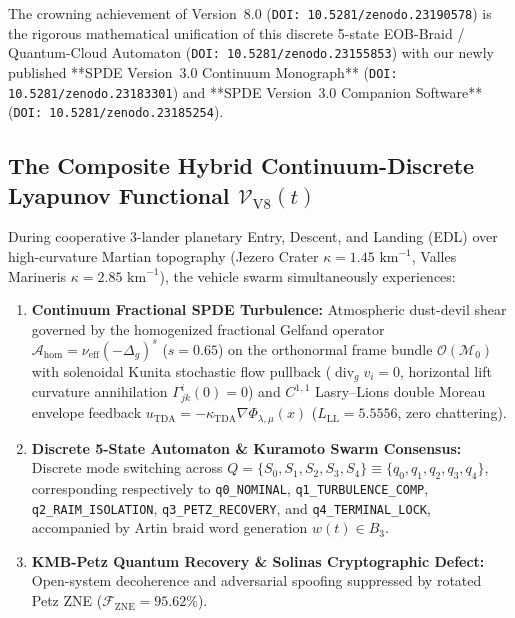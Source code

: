 \documentclass[11pt,a4paper,reqno]{article}
\theoremstyle{plain}
\theoremstyle{definition}
\theoremstyle{remark}
\numberwithin{equation}{section}
\begin{document}
The crowning achievement of Version~8.0 (\texttt{DOI: 10.5281/zenodo.23190578}) is the rigorous mathematical unification of this discrete 5-state EOB-Braid / Quantum-Cloud Automaton (\texttt{DOI: 10.5281/zenodo.23155853}) with our newly published **SPDE Version~3.0 Continuum Monograph** (\texttt{DOI: 10.5281/zenodo.23183301}) and **SPDE Version~3.0 Companion Software** (\texttt{DOI: 10.5281/zenodo.23185254}).

\subsection{The Composite Hybrid Continuum-Discrete Lyapunov Functional \texorpdfstring{$\mathcal{V}_{\mathrm{V8}}(t)$}{V\_V8(t)}}
During cooperative 3-lander planetary Entry, Descent, and Landing (EDL) over high-curvature Martian topography (Jezero Crater $\kappa = 1.45\text{ km}^{-1}$, Valles Marineris $\kappa = 2.85\text{ km}^{-1}$), the vehicle swarm simultaneously experiences:
\begin{enumerate}
    \item \textbf{Continuum Fractional SPDE Turbulence:} Atmospheric dust-devil shear governed by the homogenized fractional Gelfand operator $\mathcal{A}_{\mathrm{hom}} = \nu_{\mathrm{eff}}(-\Delta_g)^s$ ($s = 0.65$) on the orthonormal frame bundle $\mathcal{O}(\mathcal{M}_0)$ with solenoidal Kunita stochastic flow pullback ($\operatorname{div}_g v_i = 0$, horizontal lift curvature annihilation $\Gamma_{jk}^i(0) = 0$) and $C^{1,1}$ Lasry--Lions double Moreau envelope feedback $u_{\mathrm{TDA}} = -\kappa_{\mathrm{TDA}} \nabla \Phi_{\lambda,\mu}(x)$ ($L_{\mathrm{LL}} = 5.5556$, zero chattering).
    \item \textbf{Discrete 5-State Automaton \& Kuramoto Swarm Consensus:} Discrete mode switching across $Q = \{S_0, S_1, S_2, S_3, S_4\} \equiv \{q_0, q_1, q_2, q_3, q_4\}$, corresponding respectively to \texttt{q0\_NOMINAL}, \texttt{q1\_TURBULENCE\_COMP}, \texttt{q2\_RAIM\_ISOLATION}, \texttt{q3\_PETZ\_RECOVERY}, and \texttt{q4\_TERMINAL\_LOCK}, accompanied by Artin braid word generation $w(t) \in B_3$.
    \item \textbf{KMB-Petz Quantum Recovery \& Solinas Cryptographic Defect:} Open-system decoherence and adversarial spoofing suppressed by rotated Petz ZNE ($\mathcal{F}_{\mathrm{ZNE}} = 95.62\%$).
\end{enumerate}
\end{document}
